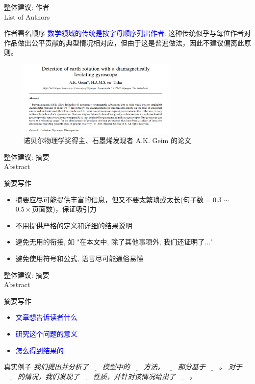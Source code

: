 \documentclass[UTF8]{ctexbeamer}
\begin{document}
\begin{frame}{整体建议: 作者 \\ List of Authors}
\begin{alertblock}{作者署名顺序}
\textcolor{blue}{数学领域的传统是按字母顺序列出作者:} 这种传统似乎与每位作者对作品做出公平贡献的典型情况相对应，但由于这是普遍做法，因此不建议偏离此原则。
\end{alertblock}
\begin{figure}
    \centering
    \includegraphics[width=0.7\textwidth]{figure/ratPaper.png}
    \caption{诺贝尔物理学奖得主、石墨烯发现者 A.K. Geim 的论文}
    \label{fig:my_label}
\end{figure}
\end{frame}

\begin{frame}{整体建议: 摘要 \\ Abstract}
\begin{alertblock}{摘要写作}
\begin{itemize}
    \item 摘要应尽可能提供丰富的信息，但又不要太繁琐或太长($\text{句子数}=0.3$ $\sim$ $0.5\times \text{页面数}$)，保证吸引力
    \item 不用提供严格的定义和详细的结果说明
    \item 避免无用的衔接, 如 "在本文中, 除了其他事项外, 我们还证明了..."
    \item 避免使用符号和公式, 语言尽可能通俗易懂
\end{itemize}
\end{alertblock}
\end{frame}

\begin{frame}{整体建议: 摘要 \\ Abstract}
\begin{alertblock}{摘要写作}
\begin{itemize}
    \item \textcolor{blue}{文章想告诉读者什么} 
    \item \textcolor{blue}{研究这个问题的意义} 
    \item \textcolor{blue}{怎么得到结果的} 
\end{itemize}
\end{alertblock}
\begin{alertblock}{真实例子}
\textit{我们提出并分析了$\underline{\qquad}$模型中的$\underline{\qquad}$方法。$\underline{\qquad}$部分基于$\underline{\qquad}$。 对于$\underline{\qquad}$的情况，我们发现了$\underline{\qquad}$性质，并针对该情况给出了$\underline{\qquad}$。}
\end{alertblock}
\end{frame}%
\end{document}
